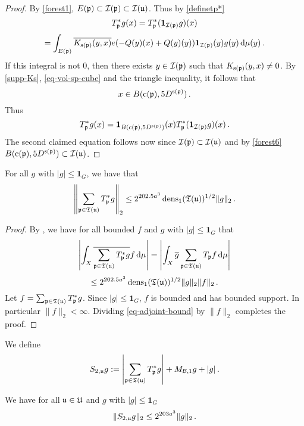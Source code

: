 \begin{proof}
    \leanok
    By \eqref{forest1}, $E({\mathfrak p}) \subset {\mathcal{I}}({\mathfrak p}) \subset {\mathcal{I}}({\mathfrak u})$. Thus by \eqref{definetp*}
    $$
         T_{{\mathfrak p}}^* g(x) = T_{{\mathfrak p}}^* (\mathbf{1}_{{\mathcal{I}}({\mathfrak p})} g)(x)
    $$
    $$
        = \int_{E({\mathfrak p})} \overline{K_{{\mathrm{s}}({\mathfrak p})}(y,x)} e(-{Q}(y)(x) + {Q}(y)(y)) \mathbf{1}_{{\mathcal{I}}({\mathfrak p})}(y) g(y) \, \mathrm{d}\mu(y)\,.
    $$
    If this integral is not $0$, then there exists $y \in {\mathcal{I}}({\mathfrak p})$ such that $K_{{\mathrm{s}}({\mathfrak p})}(y,x) \ne 0$. By \eqref{supp-Ks}, \eqref{eq-vol-sp-cube} and the triangle inequality, it follows that
    \begin{equation*}
        x \in B({\mathrm{c}}({\mathfrak p}), 5 D^{{\mathrm{s}}({\mathfrak p})})\, .
    \end{equation*}
    Thus
    $$
        T_{{\mathfrak p}}^* g(x) = \mathbf{1}_{B({\mathrm{c}}({\mathfrak p}), 5D^{{\mathrm{s}}({\mathfrak p})})}(x) T_{{\mathfrak p}}^* (\mathbf{1}_{{\mathcal{I}}({\mathfrak p})} g)(x)\,.
    $$
    The second claimed equation follows now since ${\mathcal{I}}({\mathfrak p}) \subset {\mathcal{I}}({\mathfrak u})$ and by \eqref{forest6} $B({\mathrm{c}}({\mathfrak p}), 5D^{{\mathrm{s}}({\mathfrak p})}) \subset {\mathcal{I}}({\mathfrak u})$.
\end{proof}

\begin{lemma}
    \label{adjoint-tree-estimate}
    \leanok
    For all $g$ with $|g| \le \mathbf{1}_G$, we have that
    $$
        \left\| \sum_{{\mathfrak p} \in {\mathfrak T}({\mathfrak u})} T_{{\mathfrak p}}^* g\right\|_2 \le 2^{202.5a^3} \operatorname{\operatorname{dens}}_1({\mathfrak T}({\mathfrak u}))^{1/2} \|g\|_2\,.
    $$
\end{lemma}

\begin{proof}
    \leanok
    By , we have for all bounded $f$ and $g$ with $|g| \le \mathbf{1}_G$ that
    $$
        \left| \int_X \overline{\sum_{{\mathfrak p}\in {\mathfrak T}({\mathfrak u})} T_{{\mathfrak p}}^* g} f \,\mathrm{d}\mu \right| = \left| \int_X \overline{g} \sum_{{\mathfrak p} \in {\mathfrak T}({\mathfrak u})} T_{{\mathfrak p}} f \,\mathrm{d}\mu \right|
    $$
    \begin{equation}
        \label{eq-adjoint-bound}
        \le 2^{202.5a^3} \operatorname{\operatorname{dens}}_1({\mathfrak T}({\mathfrak u}))^{1/2} \|g\|_2 \|f\|_2\,.
    \end{equation}
    Let $f = \sum_{{\mathfrak p} \in {\mathfrak T}({\mathfrak u})} T_{{\mathfrak p}}^* g$. Since $|g| \le \mathbf{1}_G$, $f$ is bounded and has bounded support. In particular $\|f\|_2 < \infty$. Dividing \eqref{eq-adjoint-bound} by $\|f\|_2$ completes the proof.
\end{proof}

We define
$$
    S_{2,{\mathfrak u}}g := \left|\sum_{{\mathfrak p} \in {\mathfrak T}({\mathfrak u})} T_{{\mathfrak p}}^*g \right| + M_{\mathcal{B},1}g + |g|\,.
$$
\begin{lemma}
    \label{adjoint-tree-control}
    \leanok
    We have for all ${\mathfrak u} \in {\mathfrak U}$ and $g$ with $|g| \le \mathbf{1}_G$
    $$
        \|S_{2, {\mathfrak u}} g\|_2 \le 2^{203a^3} \|g\|_2\,.
    $$
\end{lemma}

